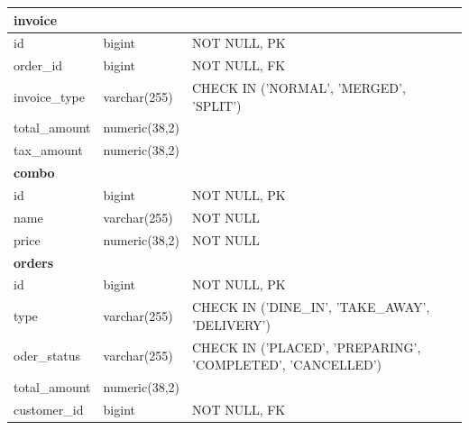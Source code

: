 \begin{longtable}{|p{3.5cm}|p{3.5cm}|p{7.5cm}|}
	\multicolumn{3}{|l|}{\textbf{invoice}}                                                                              \\
	\hline
	id                  & bigint                & NOT NULL, PK                                                          \\
	order\_id           & bigint                & NOT NULL, FK                                                          \\
	invoice\_type       & varchar(255)          & CHECK IN ('NORMAL', 'MERGED', 'SPLIT')                                \\
	total\_amount       & numeric(38,2)         &                                                                       \\
	tax\_amount         & numeric(38,2)         &                                                                       \\
	\hline

	\multicolumn{3}{|l|}{\textbf{combo}}                                                                                \\
	\hline
	id                  & bigint                & NOT NULL, PK                                                          \\
	name                & varchar(255)          & NOT NULL                                                              \\
	price               & numeric(38,2)         & NOT NULL                                                              \\
	\hline

	\multicolumn{3}{|l|}{\textbf{orders}}                                                                               \\
	\hline
	id                  & bigint                & NOT NULL, PK                                                          \\
	type                & varchar(255)          & CHECK IN ('DINE\_IN', 'TAKE\_AWAY', 'DELIVERY')                       \\
	oder\_status        & varchar(255)          & CHECK IN ('PLACED', 'PREPARING', 'COMPLETED', 'CANCELLED')            \\
	total\_amount       & numeric(38,2)         &                                                                       \\
	customer\_id        & bigint                & NOT NULL, FK                                                          \\
	\hline


\end{longtable}
